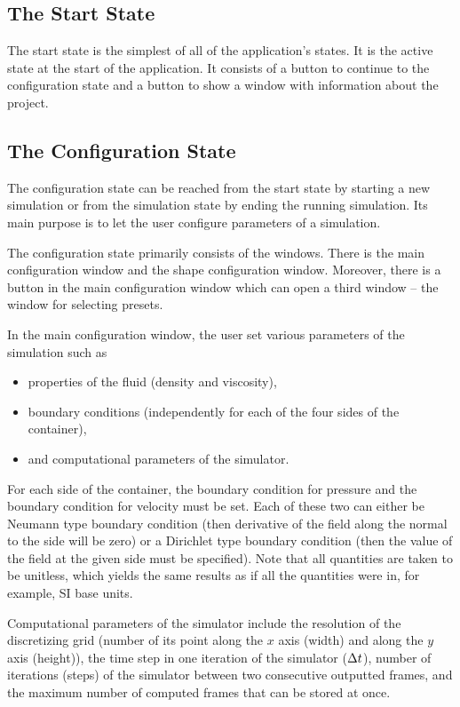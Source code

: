 \documentclass[11pt,a4paper,twoside,openright]{report}
\begin{document}
\subsection{The Start State}
The start state is the simplest of all of the application's states. It is the active state at the start of the application. It consists of a button to continue to the configuration state and a button to show a window with information about the project.

\subsection{The Configuration State}
The configuration state can be reached from the start state by starting a new simulation or from the simulation state by ending the running simulation. Its main purpose is to let the user configure parameters of a simulation.

The configuration state primarily consists of the windows. There is the main configuration window and the shape configuration window. Moreover, there is a button in the main configuration window which can open a third window -- the window for selecting presets.

In the main configuration window, the user set various parameters of the simulation such as
\begin{itemize}
	\item properties of the fluid (density and viscosity),
	\item boundary conditions (independently for each of the four sides of the container),
	\item and computational parameters of the simulator.
\end{itemize}
For each side of the container, the boundary condition for pressure and the boundary condition for velocity must be set. Each of these two can either be Neumann type boundary condition (then derivative of the field along the normal to the side will be zero) or a Dirichlet type boundary condition (then the value of the field at the given side must be specified). Note that all quantities are taken to be unitless, which yields the same results as if all the quantities were in, for example, SI base units.

Computational parameters of the simulator include the resolution of the discretizing grid (number of its point along the $x$ axis (width) and along the $y$ axis (height)), the time step in one iteration of the simulator ($\Delta t$), number of iterations (steps) of the simulator between two consecutive outputted frames, and the maximum number of computed frames that can be stored at once.
\end{document}
